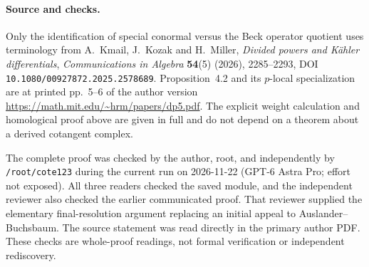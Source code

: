 \paragraph{Source and checks.}
Only the identification of special conormal versus the Beck
operator quotient uses terminology from A.~Kmail, J.~Kozak and
H.~Miller, \emph{Divided powers and K\"ahler differentials},
\emph{Communications in Algebra} \textbf{54}(5) (2026), 2285--2293,
DOI \texttt{10.1080/00927872.2025.2578689}.
Proposition~4.2 and its \(p\)-local specialization are at printed
pp.~5--6 of the author version
\url{https://math.mit.edu/~hrm/papers/dp5.pdf}.
The explicit weight calculation and homological proof above are
given in full and do not depend on a theorem about a derived
cotangent complex.

The complete proof was checked by the author, root, and independently
by \texttt{/root/cote123} during the current run on
2026-11-22 (GPT-6 Astra Pro; effort not exposed).
All three readers checked the saved module, and the independent
reviewer also checked the earlier communicated proof. That reviewer
supplied the elementary final-resolution
argument replacing an initial appeal to Auslander--Buchsbaum.
The source statement was read directly in the primary author PDF.
These checks are whole-proof readings, not formal verification
or independent rediscovery.

